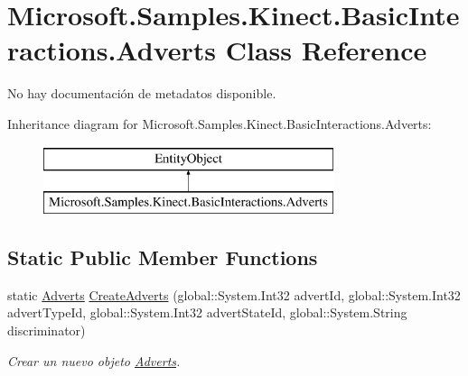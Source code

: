 \hypertarget{class_microsoft_1_1_samples_1_1_kinect_1_1_basic_interactions_1_1_adverts}{\section{Microsoft.\-Samples.\-Kinect.\-Basic\-Interactions.\-Adverts Class Reference}
\label{class_microsoft_1_1_samples_1_1_kinect_1_1_basic_interactions_1_1_adverts}
}


No hay documentación de metadatos disponible.  


Inheritance diagram for Microsoft.\-Samples.\-Kinect.\-Basic\-Interactions.\-Adverts\-:\begin{figure}[H]
\begin{center}
\leavevmode
\includegraphics[height=2.000000cm]{class_microsoft_1_1_samples_1_1_kinect_1_1_basic_interactions_1_1_adverts}
\end{center}
\end{figure}
\subsection*{Static Public Member Functions}
\begin{DoxyCompactItemize}
\item 
static \hyperlink{class_microsoft_1_1_samples_1_1_kinect_1_1_basic_interactions_1_1_adverts}{Adverts} \hyperlink{class_microsoft_1_1_samples_1_1_kinect_1_1_basic_interactions_1_1_adverts_ae222d338396ca9da498ac50c5928a46a}{Create\-Adverts} (global\-::\-System.\-Int32 advert\-Id, global\-::\-System.\-Int32 advert\-Type\-Id, global\-::\-System.\-Int32 advert\-State\-Id, global\-::\-System.\-String discriminator)
\begin{DoxyCompactList}\small\item\em Crear un nuevo objeto \hyperlink{class_microsoft_1_1_samples_1_1_kinect_1_1_basic_interactions_1_1_adverts}{Adverts}. \end{DoxyCompactList}\end{DoxyCompactItemize}
